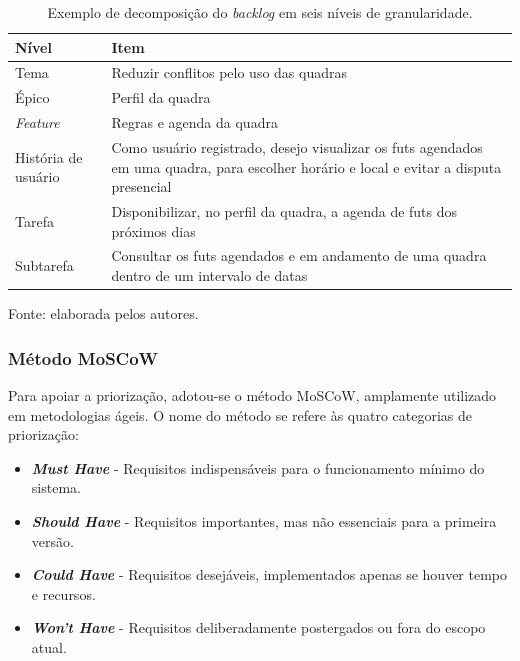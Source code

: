             \begin{table}[!htb]
                \centering
                \caption{Exemplo de decomposição do \textit{backlog} em seis níveis de granularidade.}
                \label{tab:decomposicao}
                \footnotesize
                \renewcommand{\arraystretch}{1.3}
                \begin{tabular}{p{3.2cm}p{10cm}}
                \toprule
                \textbf{Nível} & \textbf{Item} \\
                \midrule
                Tema & Reduzir conflitos pelo uso das quadras \\
                Épico & Perfil da quadra \\
                \textit{Feature} & Regras e agenda da quadra \\
                História de usuário & Como usuário registrado, desejo visualizar os futs agendados em uma quadra, para escolher horário e local e evitar a disputa presencial \\
                Tarefa & Disponibilizar, no perfil da quadra, a agenda de futs dos próximos dias \\
                Subtarefa & Consultar os futs agendados e em andamento de uma quadra dentro de um intervalo de datas \\
                \bottomrule
                \end{tabular}

                \vspace{2pt}
                {\footnotesize Fonte: elaborada pelos autores.}
            \end{table}

        \subsubsection{Método MoSCoW}

        Para apoiar a priorização, adotou-se o método MoSCoW, amplamente utilizado em metodologias ágeis. O nome do método se refere às quatro categorias de priorização:

        \begin{itemize}
            \item \textbf{\textit{Must Have}} - Requisitos indispensáveis para o funcionamento mínimo do sistema.
            \item \textbf{\textit{Should Have}} - Requisitos importantes, mas não essenciais para a primeira versão.
            \item \textbf{\textit{Could Have}} - Requisitos desejáveis, implementados apenas se houver tempo e recursos.
            \item \textbf{\textit{Won't Have}} - Requisitos deliberadamente postergados ou fora do escopo atual.
        \end{itemize}

